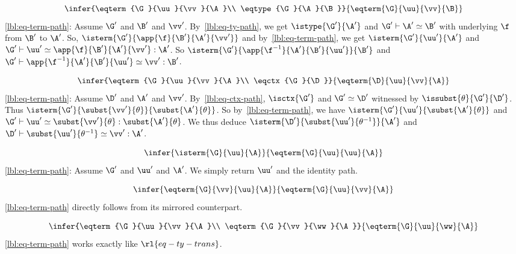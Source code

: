 \begin{equation*}
  \infer
  {\eqterm{\G}{\uu}{\vv}{\A}\\
    \eqtype{\G}{\A}{\B}}
  {\eqterm{\G}{\uu}{\vv}{\B}}
\end{equation*}
%
\eqref{lbl:eq-term-path}:
Assume $\G'$ and $\B'$ and $\vv'$.
By~\eqref{lbl:eq-ty-path}, we get $\istype{\G'}{\A'}$ and
$\G' \vdash \A' \simeq \B'$ with underlying $\f$ from $\B'$ to $\A'$.
So, $\isterm{\G'}{\app{\f}{\B'}{\A'}{\vv'}}$ and
by~\eqref{lbl:eq-term-path}, we get $\isterm{\G'}{\uu'}{\A'}$ and
$\G' \vdash \uu' \simeq \app{\f}{\B'}{\A'}{\vv'} : \A'$.
So $\isterm{\G'}{\app{\f^{-1}}{\A'}{\B'}{\uu'}}{\B'}$
and $\G' \vdash \app{\f^{-1}}{\A'}{\B'}{\uu'} \simeq \vv' : \B'$.



\begin{equation*}
  \infer
  {\eqterm{\G}{\uu}{\vv}{\A}\\
    \eqctx{\G}{\D}}
  {\eqterm{\D}{\uu}{\vv}{\A}}
\end{equation*}
%
\eqref{lbl:eq-term-path}:
Assume $\D'$ and $\A'$ and $\vv'$.
By~\eqref{lbl:eq-ctx-path}, $\isctx{\G'}$ and $\G' \simeq \D'$ witnessed
by $\issubst{\theta}{\G'}{\D'}$.
Thus $\isterm{\G'}{\subst{\vv'}{\theta}}{\subst{\A'}{\theta}}$.
So by~\eqref{lbl:eq-term-path}, we have
$\isterm{\G'}{\uu'}{\subst{\A'}{\theta}}$
and $\G' \vdash \uu' \simeq \subst{\vv'}{\theta} : \subst{\A'}{\theta}$.
We thus deduce $\isterm{\D'}{\subst{\uu'}{\theta^{-1}}}{\A'}$ and
$\D' \vdash \subst{\uu'}{\theta^{-1}} \simeq \vv' : \A'$.



\begin{equation*}
  \infer
  {\isterm{\G}{\uu}{\A}}
  {\eqterm{\G}{\uu}{\uu}{\A}}
\end{equation*}
%
\eqref{lbl:eq-term-path}:
Assume $\G'$ and $\uu'$ and $\A'$.
We simply return $\uu'$ and the identity path.



\begin{equation*}
  \infer
  {\eqterm{\G}{\vv}{\uu}{\A}}
  {\eqterm{\G}{\uu}{\vv}{\A}}
\end{equation*}
%
\eqref{lbl:eq-term-path} directly follows from its mirrored counterpart.



\begin{equation*}
  \infer
  {\eqterm{\G}{\uu}{\vv}{\A}\\
   \eqterm{\G}{\vv}{\ww}{\A}}
  {\eqterm{\G}{\uu}{\ww}{\A}}
\end{equation*}
%
\eqref{lbl:eq-term-path} works exactly like $\rl{eq-ty-trans}$.

